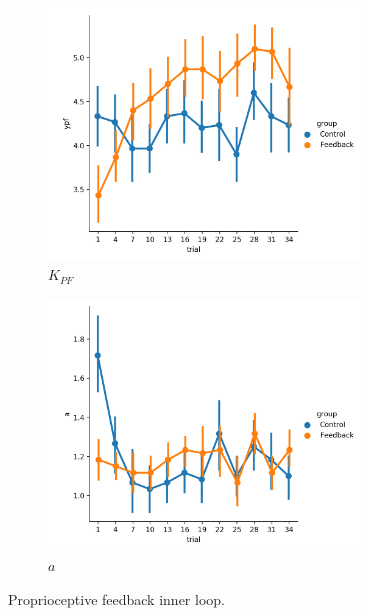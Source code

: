 \begin{figure}[t]
    \centering
    \begin{subfigure}[h]{0.49\textwidth}
        \centering
        \includegraphics[width=3.25in]{figures/ypf.png}
        \caption{$K_{PF}$}
        \label{fig:sm_ypf}
    \end{subfigure}
    \hfill
    \begin{subfigure}[h]{0.49\textwidth}
        \centering
        \includegraphics[width=3.25in]{figures/a.png}
        \caption{$a$}
        \label{fig:sm_a}
    \end{subfigure}
    \caption{Proprioceptive feedback inner loop.}
\end{figure}



